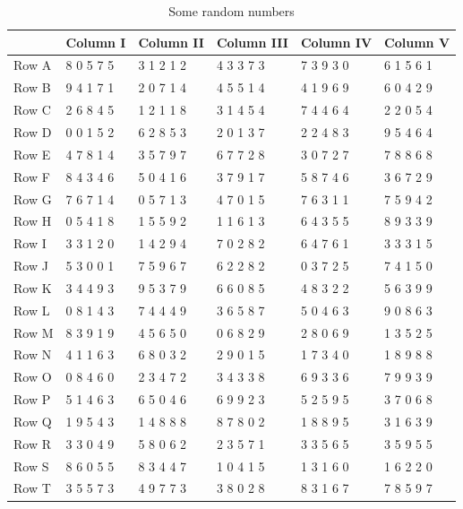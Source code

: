 \documentclass[
  11pt,
  a4paper,
  krantz2]{krantz}
\begin{document}
\begin{table}
\centering
\caption{\label{tab:unnamed-chunk-7}Some random numbers}
\centering
\fontsize{9}{11}\selectfont
\begin{tabular}[t]{llllll}
\toprule
\textbf{ } & \textbf{Column I} & \textbf{Column II} & \textbf{Column III} & \textbf{Column IV} & \textbf{Column V}\\
\midrule
Row A & 8 0 5 7 5 & 3 1 2 1 2 & 4 3 3 7 3 & 7 3 9 3 0 & 6 1 5 6 1\\
Row B & 9 4 1 7 1 & 2 0 7 1 4 & 4 5 5 1 4 & 4 1 9 6 9 & 6 0 4 2 9\\
Row C & 2 6 8 4 5 & 1 2 1 1 8 & 3 1 4 5 4 & 7 4 4 6 4 & 2 2 0 5 4\\
Row D & 0 0 1 5 2 & 6 2 8 5 3 & 2 0 1 3 7 & 2 2 4 8 3 & 9 5 4 6 4\\
Row E & 4 7 8 1 4 & 3 5 7 9 7 & 6 7 7 2 8 & 3 0 7 2 7 & 7 8 8 6 8\\
\addlinespace
Row F & 8 4 3 4 6 & 5 0 4 1 6 & 3 7 9 1 7 & 5 8 7 4 6 & 3 6 7 2 9\\
Row G & 7 6 7 1 4 & 0 5 7 1 3 & 4 7 0 1 5 & 7 6 3 1 1 & 7 5 9 4 2\\
Row H & 0 5 4 1 8 & 1 5 5 9 2 & 1 1 6 1 3 & 6 4 3 5 5 & 8 9 3 3 9\\
Row I & 3 3 1 2 0 & 1 4 2 9 4 & 7 0 2 8 2 & 6 4 7 6 1 & 3 3 3 1 5\\
Row J & 5 3 0 0 1 & 7 5 9 6 7 & 6 2 2 8 2 & 0 3 7 2 5 & 7 4 1 5 0\\
\addlinespace
Row K & 3 4 4 9 3 & 9 5 3 7 9 & 6 6 0 8 5 & 4 8 3 2 2 & 5 6 3 9 9\\
Row L & 0 8 1 4 3 & 7 4 4 4 9 & 3 6 5 8 7 & 5 0 4 6 3 & 9 0 8 6 3\\
Row M & 8 3 9 1 9 & 4 5 6 5 0 & 0 6 8 2 9 & 2 8 0 6 9 & 1 3 5 2 5\\
Row N & 4 1 1 6 3 & 6 8 0 3 2 & 2 9 0 1 5 & 1 7 3 4 0 & 1 8 9 8 8\\
Row O & 0 8 4 6 0 & 2 3 4 7 2 & 3 4 3 3 8 & 6 9 3 3 6 & 7 9 9 3 9\\
\addlinespace
Row P & 5 1 4 6 3 & 6 5 0 4 6 & 6 9 9 2 3 & 5 2 5 9 5 & 3 7 0 6 8\\
Row Q & 1 9 5 4 3 & 1 4 8 8 8 & 8 7 8 0 2 & 1 8 8 9 5 & 3 1 6 3 9\\
Row R & 3 3 0 4 9 & 5 8 0 6 2 & 2 3 5 7 1 & 3 3 5 6 5 & 3 5 9 5 5\\
Row S & 8 6 0 5 5 & 8 3 4 4 7 & 1 0 4 1 5 & 1 3 1 6 0 & 1 6 2 2 0\\
Row T & 3 5 5 7 3 & 4 9 7 7 3 & 3 8 0 2 8 & 8 3 1 6 7 & 7 8 5 9 7\\

\end{tabular}
\end{table}
\end{document}
